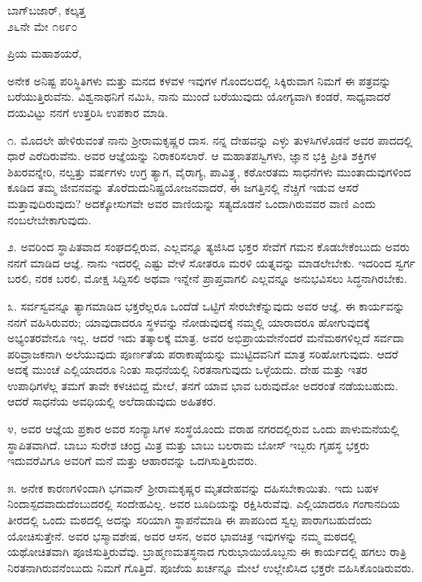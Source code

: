 \vspace{-0.5cm}

\begin{flushright}
ಬಾಗ್‌ಬಜಾರ್, ಕಲ್ಕತ್ತ\\೨೬ನೇ ಮೇ ೧೮೯೦
\end{flushright}

\noindent
ಪ್ರಿಯ ಮಹಾಶಯರೆ,

ಅನೇಕ ಅನಿಷ್ಟ ಪರಿಸ್ಥಿತಿಗಳು ಮತ್ತು ಮನದ ಕಳವಳ ಇವುಗಳ ಗೊಂದಲದಲ್ಲಿ ಸಿಕ್ಕಿರುವಾಗ ನಿಮಗೆ ಈ ಪತ್ರವನ್ನು ಬರೆಯುತ್ತಿರುವೆನು. ವಿಶ್ವನಾಥನಿಗೆ ನಮಿಸಿ, ನಾನು ಮುಂದೆ ಬರೆಯುವುದು ಯೋಗ್ಯವಾಗಿ ಕಂಡರೆ, ಸಾಧ್ಯವಾದರೆ ದಯವಿಟ್ಟು ನನಗೆ ಉತ್ತರಿಸಿ ಉಪಕಾರ ಮಾಡಿ.

೧. ಮೊದಲೇ ಹೇಳಿರುವಂತೆ ನಾನು ಶ‍್ರೀರಾಮಕೃಷ್ಣರ ದಾಸ. ನನ್ನ ದೇಹವನ್ನು ಎಳ್ಳು ತುಳಸಿಗಳೊಡನೆ ಅವರ ಪಾದದಲ್ಲಿ ಧಾರೆ ಎರೆದಿರುವೆನು. ಅವರ ಆಜ್ಞೆಯನ್ನು ನಿರಾಕರಿಸಲಾರೆ. ಆ ಮಹಾತಪಸ್ವಿಗಳು, ಜ್ಞಾನ ಭಕ್ತಿ ಪ್ರೀತಿ ಶಕ್ತಿಗಳ ಶಿಖರವನ್ನೇರಿ, ನಲ್ವತ್ತು ವರ್ಷಗಳು ಉಗ್ರ ತ್ಯಾಗ, ವೈರಾಗ್ಯ, ಪಾವಿತ್ರ್ಯ, ಕಠೋರತಮ ಸಾಧನೆಗಳು ಮುಂತಾದುವುಗಳಿಂದ ಕೂಡಿದ ತಮ್ಮ ಜೀವನವನ್ನು ತೊರೆದುದುನಿಷ್ಪ್ರಯೋಜನವಾದರೆ, ಈ ಜಗತ್ತಿನಲ್ಲಿ ನೆಚ್ಚಿಗೆ ಇಡುವ ಆಸರೆ ಮತ್ತಾವುದಿರುವುದು? ಅದಕ್ಕೋಸುಗವೇ ಅವರ ವಾಣಿಯನ್ನು ಸತ್ಯದೊಡನೆ ಒಂದಾಗಿರುವವರ ವಾಣಿ ಎಂದು ನಂಬಲೇಬೇಕಾಗುವುದು.

೨. ಅವರಿಂದ ಸ್ಥಾಪಿತವಾದ ಸಂಘದಲ್ಲಿರುವ, ಎಲ್ಲವನ್ನೂ ತ್ಯಜಿಸಿದ ಭಕ್ತರ ಸೇವೆಗೆ ಗಮನ ಕೊಡಬೇಕೆಂಬುದು ಅವರು ನನಗೆ ಮಾಡಿದ ಆಜ್ಞೆ. ನಾನು ಇದರಲ್ಲಿ ಎಷ್ಟು ವೇಳೆ ಸೋತರೂ ಮರಳಿ ಯತ್ನವನ್ನು ಮಾಡಲೇಬೇಕು. ಇದರಿಂದ ಸ್ವರ್ಗ ಬರಲಿ, ನರಕ ಬರಲಿ, ಮೋಕ್ಷ ಸಿದ್ದಿಸಲಿ ಅಥವಾ ಇನ್ನೇನೆ ಪ್ರಾಪ್ತವಾಗಲಿ ಎಲ್ಲವನ್ನೂ ಅನುಭವಿಸಲು ಸಿದ್ಧನಾಗಿರಬೇಕು.

೩. ಸರ್ವಸ್ವವನ್ನೂ ತ್ಯಾಗಮಾಡಿದ ಭಕ್ತರೆಲ್ಲರೂ ಒಂದೆಡೆ ಒಟ್ಟಿಗೆ ಸೇರಬೇಕೆನ್ನುವುದು ಅವರ ಆಜ್ಞೆ. ಈ ಕಾರ್ಯವನ್ನು ನನಗೆ ವಹಿಸಿರುವರು; ಯಾವುದಾದರೂ ಸ್ಥಳವನ್ನು ನೋಡುವುದಕ್ಕೆ ನಮ್ಮಲ್ಲಿ ಯಾರಾದರೂ ಹೋಗುವುದಕ್ಕೆ ಅಭ್ಯಂತರವೇನೂ ಇಲ್ಲ. ಆದರೆ ಇದು ತತ್ಕಾಲಕ್ಕೆ ಮಾತ್ರ. ಅವರ ಅಭಿಪ್ರಾಯವೇನೆಂದರೆ ಮನೆಮಠಗಳಿಲ್ಲದೆ ಸರ್ವದಾ ಪರಿವ್ರಾಜಕನಾಗಿ ಅಲೆಯುವುದು ಪೂರ್ಣತೆಯ ಪರಾಕಾಷ್ಠೆಯನ್ನು ಮುಟ್ಟಿದವನಿಗೆ ಮಾತ್ರ ಸರಿಹೋಗುವುದು. ಆದರೆ ಅದಕ್ಕೆ ಮುಂಚೆ ಎಲ್ಲಿಯಾದರೂ ನಿಂತು ಸಾಧನೆಯಲ್ಲಿ ನಿರತನಾಗುವುದು ಒಳ್ಳೆಯದು. ದೇಹ ಮತ್ತು ಇತರ ಉಪಾಧಿಗಳೆಲ್ಲ ತಮಗೆ ತಾವೇ ಕಳಚಿಬಿದ್ದ ಮೇಲೆ, ತನಗೆ ಯಾವ ಭಾವ ಬರುವುದೋ ಅದರಂತೆ ನಡೆಯಬಹುದು. ಆದರೆ ಸಾಧನೆಯ ಅವಧಿಯಲ್ಲಿ ಅಲೆದಾಡುವುದು ಅಹಿತಕರ.

೪, ಅವರ ಆಜ್ಞೆಯ ಪ್ರಕಾರ ಅವರ ಸಂನ್ಯಾಸಿಗಳ ಸಂಸ್ಥೆಯೊಂದು ವರಾಹ ನಗರದಲ್ಲಿರುವ ಒಂದು ಪಾಳುಮನೆಯಲ್ಲಿ ಸ್ಥಾಪಿತವಾಗಿದೆ. ಬಾಬು ಸುರೇಶ ಚಂದ್ರ ಮಿತ್ರ ಮತ್ತು ಬಾಬು ಬಲರಾಮ ಬೋಸ್ ಇಬ್ಬರು ಗೃಹಸ್ಥ ಭಕ್ತರು ಇದುವರೆವಿಗೂ ಅವರಿಗೆ ಮನೆ ಮತ್ತು ಆಹಾರವನ್ನು ಒದಗಿಸುತ್ತಿರುವರು.

೫. ಅನೇಕ ಕಾರಣಗಳಿಂದಾಗಿ ಭಗವಾನ್ ಶ‍್ರೀರಾಮಕೃಷ್ಣರ ಮೃತದೇಹವನ್ನು ದಹಿಸಬೇಕಾಯಿತು. ಇದು ಬಹಳ ನಿಂದಾಸ್ಪದವಾದುದೆಂಬುದರಲ್ಲಿ ಸಂದೇಹವಿಲ್ಲ. ಅವರ ಬೂದಿಯನ್ನು ರಕ್ಷಿಸಿರುವೆವು. ಎಲ್ಲಿಯಾದರೂ ಗಂಗಾನದಿಯ ತೀರದಲ್ಲಿ ಒಂದು ಮಠದಲ್ಲಿ ಅದನ್ನು ಸರಿಯಾಗಿ ಸ್ಥಾಪನೆಮಾಡಿ ಈ ಪಾಪದಿಂದ ಸ್ವಲ್ಪ ಪಾರಾಗಬಹುದೆಂದು ಯೋಚಿಸುತ್ತೇನೆ. ಅವರ ಭಸ್ಮಾವಶೇಷ, ಅವರ ಆಸನ, ಅವರ ಭಾವಚಿತ್ರ ಇವುಗಳನ್ನು ನಮ್ಮ ಮಠದಲ್ಲಿ ಯಥೋಚಿತವಾಗಿ ಪೂಜಿಸುತ್ತಿರುವೆವು. ಬ್ರಾಹ್ಮಣಮತಸ್ಥನಾದ ಗುರುಭಾಯಿಯೊಬ್ಬನು ಈ ಕಾರ್ಯದಲ್ಲಿ ಹಗಲು ರಾತ್ರಿ ನಿರತನಾಗಿರುವನೆಂಬುದು ನಿಮಗೆ ಗೊತ್ತಿದೆ. ಪೂಜೆಯ ಖರ್ಚನ್ನೂ ಮೇಲೆ ಉಲ್ಲೇಖಿಸಿದ ಭಕ್ತರೇ ವಹಿಸಿಕೊಂಡಿರುವರು.

